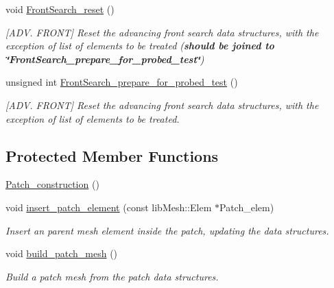 \begin{DoxyCompactItemize}
void \hyperlink{classcarl_1_1_patch__construction_a010ad97f50138f7665a58beead4fc625}{Front\+Search\+\_\+reset} ()
\begin{DoxyCompactList}\small\item\em \mbox{[}A\+D\+V. F\+R\+O\+N\+T\mbox{]} Reset the advancing front search data structures, with the exception of list of elements to be treated ({\bfseries should be joined to \char`\"{}\+Front\+Search\+\_\+prepare\+\_\+for\+\_\+probed\+\_\+test\char`\"{}}) \end{DoxyCompactList}\item 
unsigned int \hyperlink{classcarl_1_1_patch__construction_abefcdd339c281cbdf07a14de7517a975}{Front\+Search\+\_\+prepare\+\_\+for\+\_\+probed\+\_\+test} ()
\begin{DoxyCompactList}\small\item\em \mbox{[}A\+D\+V. F\+R\+O\+N\+T\mbox{]} Reset the advancing front search data structures, with the exception of list of elements to be treated. \end{DoxyCompactList}\end{DoxyCompactItemize}
\subsection*{Protected Member Functions}
\begin{DoxyCompactItemize}
\item 
\hyperlink{classcarl_1_1_patch__construction_a78474f4c77674b43140c4aa77a0c255a}{Patch\+\_\+construction} ()
\item 
void \hyperlink{classcarl_1_1_patch__construction_ae7a46ef950445a82cb0036b49b778fbf}{insert\+\_\+patch\+\_\+element} (const lib\+Mesh\+::\+Elem $\ast$Patch\+\_\+elem)
\begin{DoxyCompactList}\small\item\em Insert an parent mesh element inside the patch, updating the data structures. \end{DoxyCompactList}\item 
void \hyperlink{classcarl_1_1_patch__construction_ab4e5b3f8e8f2a7c0af44979a8b0a39c4}{build\+\_\+patch\+\_\+mesh} ()
\begin{DoxyCompactList}\small\item\em Build a patch mesh from the patch data structures. \end{DoxyCompactList}\end{DoxyCompactItemize}
